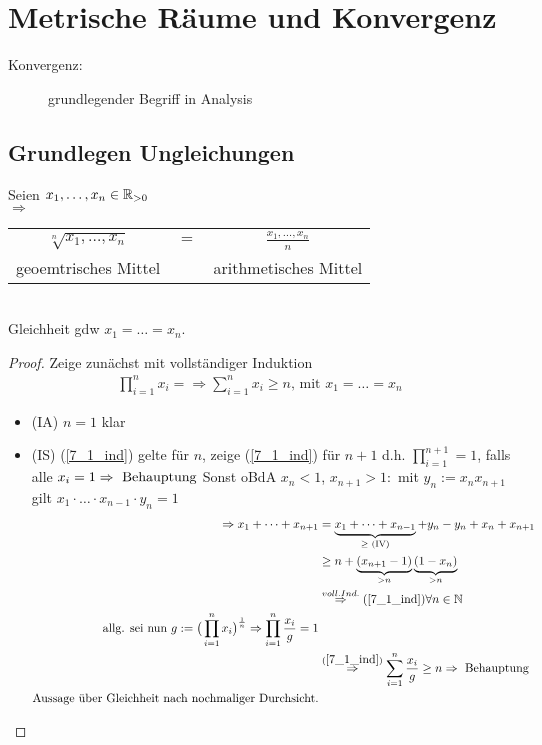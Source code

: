 \part{Metrische Räume und Konvergenz}
\begin{description}
	\item[Konvergenz:] grundlegender Begriff in Analysis %
\end{description}
\chapter{Grundlegen Ungleichungen}

\begin{satz}\label{satz_7_1_geo_mittel}
	Seien $x_1, \dots, x_n \in \mathbb{R}_{>0}$\\
$\Rightarrow$
	\begin{tabular}{ccc}
		$ \sqrt[n]{x_1, \dots, x_n}$ & $=$ & $\frac{x_1, \dots, x_n}{n}$ \\
		geoemtrisches Mittel &  & arithmetisches Mittel \\
	\end{tabular}\\
Gleichheit gdw $x_1 = \dots = x_n$.
\end{satz}

\begin{proof}
	Zeige zunächst mit vollständiger Induktion\\
	\begin{align} %
	\prod_{i=1}^{n}x_i= \Rightarrow \sum_{i=1}^{n} x_i \geq n \text{, mit } x_1=\dots=x_n \label{7_1_ind}
	\end{align}
	\begin{itemize}
		\item (IA) $n = 1$ klar
	    \item (IS) (\ref{7_1_ind}) gelte für $n$, zeige (\ref{7_1_ind}) für $n+1$ d.h. $\prod_{i=1}^{n+1} = 1$, falls alle $x_i=1 \Rightarrow \text{ Behauptung}$ Sonst oBdA $x_n < 1$, $x_{n+1} > 1:$ mit $y_n:=x_n x_{n+1}$ gilt $x_1\cdot\dots\cdot x_{n-1}\cdot y_n=1$
	    \begin{align*}\nonumber
	        \Rightarrow x_1 + \dots + x_{n+1} &= \underbrace{x_1+\dots+x_{n-1}}_{\geq \text{ (IV)}} + y_n - y_n + x_n+x_{n+1}\\ &\geq n + \underbrace{(x_{n+1} -1)}_{>n}\underbrace{(1-x_n)}_{>n}\\ &\overset{voll. Ind.}{\Rightarrow} (\ref{7_1_ind}) \forall n \in \mathbb{N}\\ \text{allg. sei nun } g:=\big( \prod_{i=1}^{n} x_i \big)^{\frac{1}{n}} \Rightarrow \prod_{i=1}^{n} \frac{x_i}{g} = 1 \\& \overset{(\ref{7_1_ind})}{\Rightarrow} \sum_{i=1}^{n} \frac{x_i}{g} \geq n \Rightarrow \text{ Behauptung}\\ \text{Aussage über Gleichheit nach nochmaliger Durchsicht.}
	    \end{align*}
	\end{itemize} 
	\QEDA
\end{proof}

